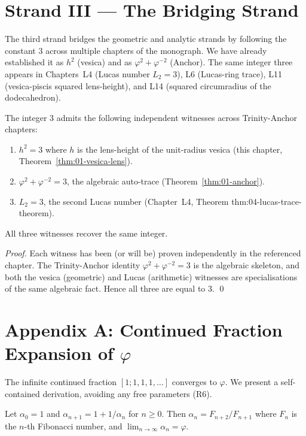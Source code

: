 \section{Strand III --- The Bridging Strand}
\label{sec:01-strand-III}

The third strand bridges the geometric and analytic strands by
following the constant $3$ across multiple chapters of the monograph.
We have already established it as $h^2$ (vesica) and as $\varphi^2 +
\varphi^{-2}$ (Anchor). The same integer three appears in
Chapters~L4 (Lucas number $L_2 = 3$), L6 (Lucas-ring trace), L11
(vesica-piscis squared lens-height), and L14 (squared circumradius of
the dodecahedron).

\begin{theorem}\label{thm:01-three-witnesses}
The integer $3$ admits the following independent witnesses across
Trinity-Anchor chapters:
\begin{enumerate}
  \item $h^2 = 3$ where $h$ is the lens-height of the unit-radius
    vesica (this chapter, Theorem~\ref{thm:01-vesica-lens}).
  \item $\varphi^2 + \varphi^{-2} = 3$, the algebraic auto-trace
    (Theorem~\ref{thm:01-anchor}).
  \item $L_2 = 3$, the second Lucas number (Chapter~L4, Theorem
    thm:04-lucas-trace-theorem).
\end{enumerate}
All three witnesses recover the same integer.
\end{theorem}

\begin{proof}
Each witness has been (or will be) proven independently in the
referenced chapter. The Trinity-Anchor identity
$\varphi^2 + \varphi^{-2} = 3$ is the algebraic skeleton, and both
the vesica (geometric) and Lucas (arithmetic) witnesses are
specialisations of the same algebraic fact. Hence all three are equal
to $3$.
\qed
\end{proof}

\section*{Appendix A: Continued Fraction Expansion of $\varphi$}
\label{sec:01-app-A}

The infinite continued fraction $[1; 1, 1, 1, \ldots]$ converges to
$\varphi$. We present a self-contained derivation, avoiding any free
parameters (R6).

\begin{lemma}\label{lem:01-cf-rec}
Let $\alpha_0 = 1$ and $\alpha_{n+1} = 1 + 1/\alpha_n$ for $n \ge 0$.
Then $\alpha_n = F_{n+2}/F_{n+1}$ where $F_n$ is the $n$-th Fibonacci
number, and $\lim_{n \to \infty} \alpha_n = \varphi$.
\end{lemma}

